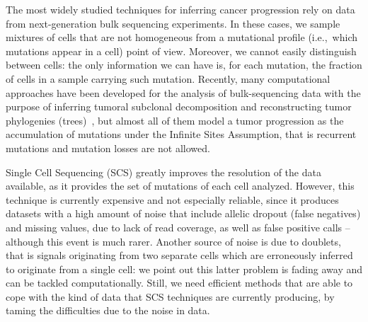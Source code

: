 \documentclass[a4paper,USenglish]{article}
\newcommand{\ie}{i.e.,~}
\theoremstyle{definition}
\begin{document}
The most widely studied techniques for inferring cancer progression rely on data from next-generation bulk sequencing experiments.
In these cases, we sample mixtures of cells that are not homogeneous from a mutational
profile (\ie which mutations appear in a cell) point of view.
Moreover, we cannot easily distinguish between cells: the only information we can have is,
for each mutation, the fraction of cells in a sample carrying such mutation.
Recently, many computational approaches have been developed for the analysis of
bulk-sequencing data with the purpose of inferring tumoral subclonal decomposition and
reconstructing tumor phylogenies
(trees)~\cite{Strino2013,Jiao2014,Hajirasouliha2014,Yuan2015,Popic2015,citup,El-Kebir2016,marass2016,doi:10.1093/bioinformatics/btx270,Bonizzoni:2017:BPP:3107411.3107441},
but almost all of them model a tumor progression as the accumulation of mutations under the
Infinite Sites Assumption, that is recurrent mutations and mutation losses are not allowed.


Single Cell Sequencing (SCS) greatly improves the resolution of the data available, as it
provides the set of mutations of each cell analyzed.
However, this technique is currently expensive and not especially reliable, since it
produces datasets with a high amount of noise that include allelic dropout (false
negatives) and missing values, due to lack of read coverage, as well as false positive
calls -- although this event is much rarer.
Another source of noise is due to doublets, that is signals originating from two separate
cells which are erroneously inferred to originate from a single cell: we point out this latter
problem is fading away and can be tackled computationally.
Still, we need efficient methods that are able to cope with the kind of data that SCS
techniques are currently producing, by taming the difficulties due to the noise in data.
\end{document}
